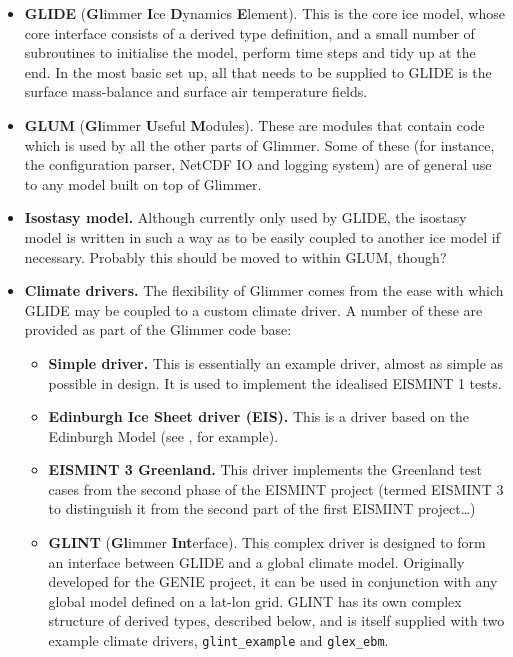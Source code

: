 \begin{itemize}
\item \textbf{GLIDE} (\textbf{Gl}immer \textbf{I}ce \textbf{D}ynamics
  \textbf{E}lement). This is the core ice model, whose core interface consists
  of a derived type definition, and a small number of subroutines to
  initialise the model, perform time steps and tidy up at the end. In the most
  basic set up, all that needs to be supplied to GLIDE is the surface
  mass-balance and surface air temperature fields.
\item \textbf{GLUM} (\textbf{Gl}immer \textbf{U}seful \textbf{M}odules). These
  are modules that contain code which is used by all the other parts of
  Glimmer. Some of these (for instance, the configuration parser, NetCDF IO
  and logging system) are of general use to any model built on top of
  Glimmer.
\item \textbf{Isostasy model.} Although currently only used by GLIDE, the
  isostasy model is written in such a way as to be easily coupled to another
  ice model if necessary. Probably this should be moved to within GLUM,
  though?
\item \textbf{Climate drivers.} The flexibility of Glimmer comes from the ease
  with which GLIDE may be coupled to a custom climate driver. A number of
  these are provided as part of the Glimmer code base:
\begin{itemize}
\item \textbf{Simple driver.} This is essentially an example driver, almost as simple
  as possible in design. It is used to implement the idealised EISMINT 1
  tests.
\item \textbf{Edinburgh Ice Sheet driver (EIS).} This is a driver based on the
  Edinburgh Model (see \cite{Hagdorn2003}, for example).
\item \textbf{EISMINT 3 Greenland.} This driver implements the Greenland test
  cases from the second phase of the EISMINT project (termed EISMINT 3 to
  distinguish it from the second part of the first EISMINT project\ldots)
\item \textbf{GLINT} (\textbf{Gl}immer \textbf{Int}erface). This complex
  driver is designed to form an interface between GLIDE and a global climate
  model. Originally developed for the GENIE project, it can be used in
  conjunction with any global model defined on a lat-lon grid. GLINT has its
  own complex structure of derived types, described below, and is itself
  supplied with two example climate drivers, \texttt{glint\_example} and \texttt{glex\_ebm}.
\end{itemize}
\end{itemize}
%
